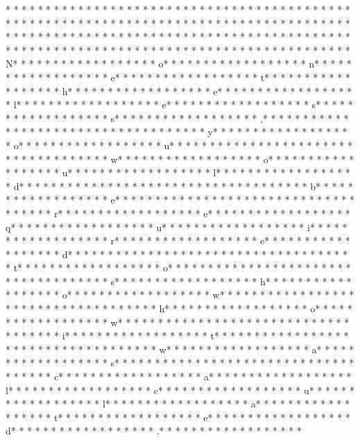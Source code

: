 * * *  * * *  * * *  *  * * *  *  * * *  * * *  * * *  *  * * *  *  * * *  * * *  * * *  *  * * *  *  * * *  *  * * *  * * *  * * *  *  * * *  *  * * *  *  * * *  * * *  * * *  *  * * *  *  * * *  *  * * *  * * *  * * *  *  * * *  *  * * *  *  * * *  * * *  * * *  *  * * *  *  * * *  *  * * *  * * *  * * *  *  * * *  *  * * *  *  * * *  * * *  * * *  *  * * *  *  * * *  *  * * *  * * *  * * *  *  * * *  *  * * *  * N* * *  * * *  * * *  *  * * *  *  * * *  * o* * *  * * *  * * *  *  * * *  *  * * *  * n* * *  * * *  * * *  *  * * *  *  * * *  * e* * *  * * *  * * *  *  * * *  *  * * *  * t* * *  * * *  * * *  *  * * *  *  * * *  * h* * *  * * *  * * *  *  * * *  *  * * *  * e* * *  * * *  * * *  *  * * *  *  * * *  * l* * *  * * *  * * *  *  * * *  *  * * *  * e* * *  * * *  * * *  *  * * *  *  * * *  * s* * *  * * *  * * *  *  * * *  *  * * *  * s* * *  * * *  * * *  *  * * *  *  * * *  * ,* * *  * * *  * * *  *  * * *  *  * * *  *  * * *  * * *  * * *  *  * * *  *  * * *  * y* * *  * * *  * * *  *  * * *  *  * * *  * o* * *  * * *  * * *  *  * * *  *  * * *  * u* * *  * * *  * * *  *  * * *  *  * * *  *  * * *  * * *  * * *  *  * * *  *  * * *  * w* * *  * * *  * * *  *  * * *  *  * * *  * o* * *  * * *  * * *  *  * * *  *  * * *  * u* * *  * * *  * * *  *  * * *  *  * * *  * l* * *  * * *  * * *  *  * * *  *  * * *  * d* * *  * * *  * * *  *  * * *  *  * * *  *  * * *  * * *  * * *  *  * * *  *  * * *  * b* * *  * * *  * * *  *  * * *  *  * * *  * e* * *  * * *  * * *  *  * * *  *  * * *  *  * * *  * * *  * * *  *  * * *  *  * * *  * r* * *  * * *  * * *  *  * * *  *  * * *  * e* * *  * * *  * * *  *  * * *  *  * * *  * q* * *  * * *  * * *  *  * * *  *  * * *  * u* * *  * * *  * * *  *  * * *  *  * * *  * i* * *  * * *  * * *  *  * * *  *  * * *  * r* * *  * * *  * * *  *  * * *  *  * * *  * e* * *  * * *  * * *  *  * * *  *  * * *  * d* * *  * * *  * * *  *  * * *  *  * * *  *  * * *  * * *  * * *  *  * * *  *  * * *  * t* * *  * * *  * * *  *  * * *  *  * * *  * o* * *  * * *  * * *  *  * * *  *  * * *  *  * * *  * * *  * * *  *  * * *  *  * * *  * s* * *  * * *  * * *  *  * * *  *  * * *  * h* * *  * * *  * * *  *  * * *  *  * * *  * o* * *  * * *  * * *  *  * * *  *  * * *  * w* * *  * * *  * * *  *  * * *  *  * * *  *  * * *  * * *  * * *  *  * * *  *  * * *  * h* * *  * * *  * * *  *  * * *  *  * * *  * o* * *  * * *  * * *  *  * * *  *  * * *  * w* * *  * * *  * * *  *  * * *  *  * * *  *  * * *  * * *  * * *  *  * * *  *  * * *  * i* * *  * * *  * * *  *  * * *  *  * * *  * t* * *  * * *  * * *  *  * * *  *  * * *  *  * * *  * * *  * * *  *  * * *  *  * * *  * w* * *  * * *  * * *  *  * * *  *  * * *  * a* * *  * * *  * * *  *  * * *  *  * * *  * s* * *  * * *  * * *  *  * * *  *  * * *  *  * * *  * * *  * * *  *  * * *  *  * * *  * c* * *  * * *  * * *  *  * * *  *  * * *  * a* * *  * * *  * * *  *  * * *  *  * * *  * l* * *  * * *  * * *  *  * * *  *  * * *  * c* * *  * * *  * * *  *  * * *  *  * * *  * u* * *  * * *  * * *  *  * * *  *  * * *  * l* * *  * * *  * * *  *  * * *  *  * * *  * a* * *  * * *  * * *  *  * * *  *  * * *  * t* * *  * * *  * * *  *  * * *  *  * * *  * e* * *  * * *  * * *  *  * * *  *  * * *  * d* * *  * * *  * * *  *  * * *  *  * * *  * .* * *  * * *  * * *  *  * * *  *  * * *  * 
